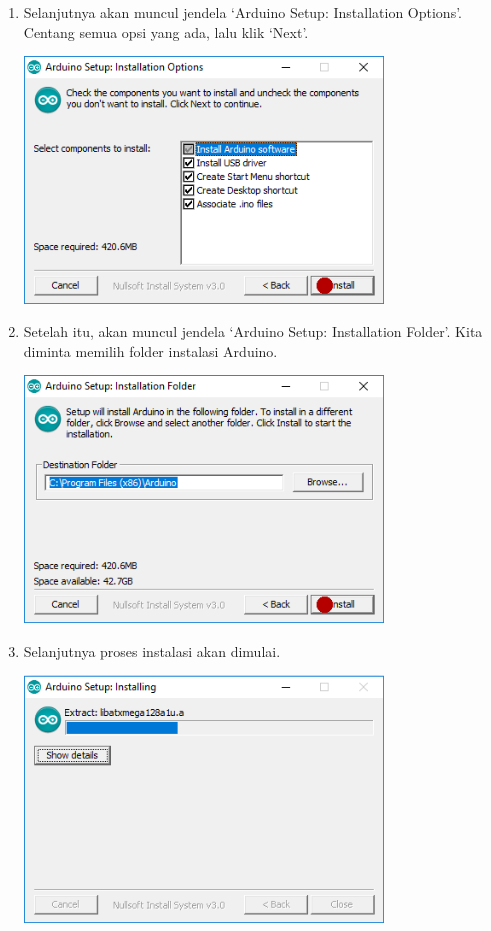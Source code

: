 \begin{enumerate}
\item Selanjutnya akan muncul jendela `Arduino Setup: Installation Options'. Centang semua opsi yang ada, lalu klik `Next'.
\break\\
\centerline{\includegraphics[width=0.75\textwidth]{figures/aride2.png}}
\item Setelah itu, akan muncul jendela `Arduino Setup: Installation Folder'. Kita diminta memilih folder instalasi Arduino.
\break\\
\centerline{\includegraphics[width=0.75\textwidth]{figures/aride3.png}}
\item Selanjutnya proses instalasi akan dimulai.
\break\\
\centerline{\includegraphics[width=0.75\textwidth]{figures/aride4.png}}

\end{enumerate}
